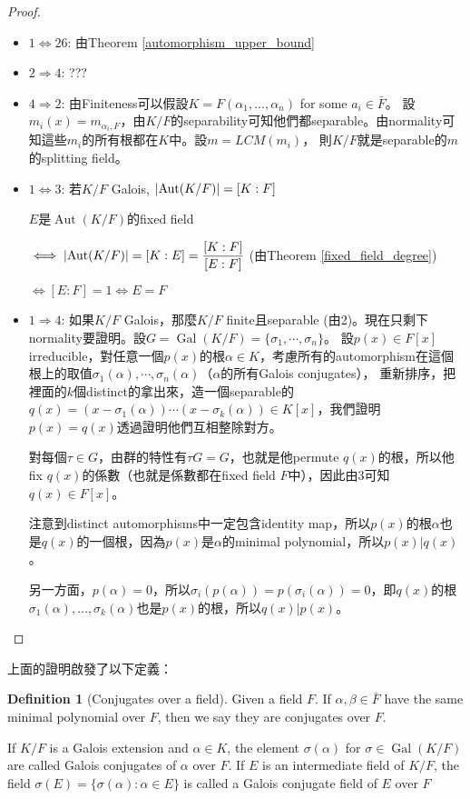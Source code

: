 \documentclass[12pt]{article}
\theoremstyle{definition}
\newtheorem{dfn}{Definition}
\DeclareMathOperator{\Aut}{Aut}
\DeclareMathOperator{\Gal}{Gal}
\begin{document}
\begin{proof}
	\begin{itemize}
		\item $1 \iff 26 $: 由Theorem \ref{automorphism_upper_bound}
		\item $2\Rightarrow4$: ???
		\item $4\Rightarrow2$: 由Finiteness可以假設$K=F(\alpha_1,...,\alpha_n)$ for some $a_i\in\bar{F}$。
		      設$m_i(x)=m_{\alpha_i, F}$，由$K/F$的separability可知他們都separable。由normality可知這些$m_i$的所有根都在$K$中。設$m=LCM(m_i)$，
		      則$K/F$就是separable的$m$的splitting field。
		\item $1\iff 3$: 若$K/F$ Galois, $\abs{\Aut(K/F)}=[K:F]$

		      $E$是$\Aut(K/F)$的fixed field

		      $\iff \abs{\Aut(K/F)}=[K:E]=\dfrac{[K:F]}{[E:F]}$ (由Theorem \ref{fixed_field_degree})

		      $\iff [E:F]=1 \iff E=F$
		\item $1\Rightarrow4$: 如果$K/F$ Galois，那麼$K/F$ finite且separable (由2)。現在只剩下normality要證明。設$G=\Gal(K/F)=\{\sigma_1,\cdots,\sigma_n\}$。
		      設$p(x)\in F[x]$ irreducible，對任意一個$p(x)$的根$\alpha\in K$，考慮所有的automorphism在這個根上的取值$\sigma_1(\alpha),\cdots,\sigma_n(\alpha)$（$\alpha$的所有Galois conjugates），
		      重新排序，把裡面的$k$個distinct的拿出來，造一個separable的$q(x)=(x-\sigma_1(\alpha))\cdots(x-\sigma_k(\alpha))\in K[x]$，我們證明$p(x)=q(x)$透過證明他們互相整除對方。

		      對每個$\tau\in G$，由群的特性有$\tau G=G$，也就是他permute $q(x)$的根，所以他fix $q(x)$的係數（也就是係數都在fixed field $F$中），因此由3可知$q(x)\in F[x]$。

		      注意到distinct automorphisms中一定包含identity map，所以$p(x)$的根$\alpha$也是$q(x)$的一個根，因為$p(x)$是$\alpha$的minimal polynomial，所以$p(x)|q(x)$。

		      另一方面，$p(\alpha)=0$，所以$\sigma_i(p(\alpha))=p(\sigma_i(\alpha))=0$，即$q(x)$的根$\sigma_1(\alpha),...,\sigma_k(\alpha)$也是$p(x)$的根，所以$q(x)|p(x)$。

	\end{itemize}
\end{proof}

上面的證明啟發了以下定義：

\begin{dfn}[Conjugates over a field]
	Given a field $F$.
	If $\alpha,\beta\in\bar{F}$
	have the same minimal polynomial over $F$, then
	we say they are conjugates over $F$.

	If $K/F$ is a Galois extension and $\alpha\in K$, the element $\sigma(\alpha)$ for $\sigma\in \Gal(K/F)$ are called
	Galois conjugates of $\alpha$ over $F$. If $E$ is an intermediate field of $K/F$, the field $\sigma(E)=\{\sigma(\alpha):\alpha\in E\}$
	is called a Galois conjugate field of $E$ over $F$
\end{dfn}
\end{document}
